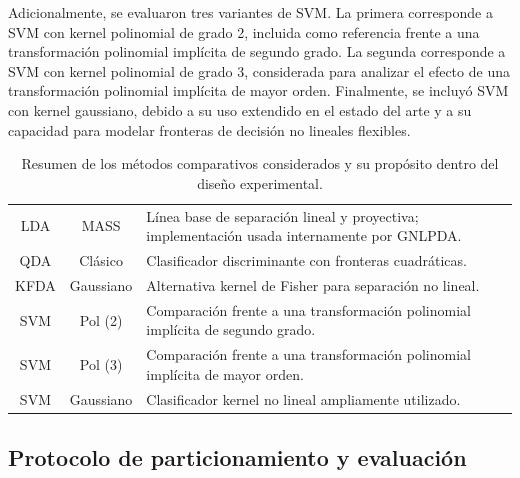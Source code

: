 Adicionalmente, se evaluaron tres variantes de SVM. La primera corresponde a SVM con kernel polinomial de grado 2, incluida como referencia frente a una transformación polinomial implícita de segundo grado. La segunda corresponde a SVM con kernel polinomial de grado 3, considerada para analizar el efecto de una transformación polinomial implícita de mayor orden. Finalmente, se incluyó SVM con kernel gaussiano, debido a su uso extendido en el estado del arte y a su capacidad para modelar fronteras de decisión no lineales flexibles.

\begin{table}[htbp] \centering \begin{tabular}{|c|c|C{8cm}|} \hline {} &  &  \\ \hline LDA & MASS & Línea base de separación lineal y proyectiva; implementación usada internamente por GNLPDA. \\ \hline QDA & Clásico & Clasificador discriminante con fronteras cuadráticas. \\ \hline KFDA & Gaussiano & Alternativa kernel de Fisher para separación no lineal. \\ \hline SVM & Pol (2) & Comparación frente a una transformación polinomial implícita de segundo grado. \\ \hline SVM & Pol (3) & Comparación frente a una transformación polinomial implícita de mayor orden. \\ \hline SVM & Gaussiano & Clasificador kernel no lineal ampliamente utilizado. \\ \hline \end{tabular} \caption{Resumen de los métodos comparativos considerados y su propósito dentro del diseño experimental.} \label{tab:MM6} \end{table}






\subsection{Protocolo de particionamiento y evaluación}

